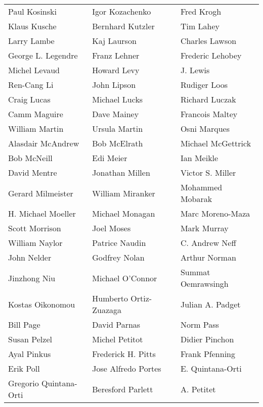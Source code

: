 \begin{tabular}{lll}
Paul Kosinski          & Igor Kozachenko        & Fred Krogh\\
Klaus Kusche           & Bernhard Kutzler       & Tim Lahey\\
Larry Lambe            & Kaj Laurson            & Charles Lawson\\
George L. Legendre     & Franz Lehner           & Frederic Lehobey\\
Michel Levaud          & Howard Levy            & J. Lewis\\
Ren-Cang Li            & John Lipson            & Rudiger Loos\\
Craig Lucas            & Michael Lucks          & Richard Luczak\\
Camm Maguire           & Dave Mainey            & Francois Maltey\\
William Martin         & Ursula Martin          & Osni Marques\\
Alasdair McAndrew      & Bob McElrath           & Michael McGettrick\\
Bob McNeill            & Edi Meier              & Ian Meikle\\
David Mentre           & Jonathan Millen        & Victor S. Miller\\
Gerard Milmeister      & William Miranker       & Mohammed Mobarak\\
H. Michael Moeller     & Michael Monagan        & Marc Moreno-Maza\\
Scott Morrison         & Joel Moses             & Mark Murray\\
William Naylor         & Patrice Naudin         & C. Andrew Neff\\
John Nelder            & Godfrey Nolan          & Arthur Norman\\
Jinzhong Niu           & Michael O'Connor       & Summat Oemrawsingh\\
Kostas Oikonomou       & Humberto Ortiz-Zuazaga & Julian A. Padget\\
Bill Page              & David Parnas           & Norm Pass\\
Susan Pelzel           & Michel Petitot         & Didier Pinchon\\
Ayal Pinkus            & Frederick H. Pitts     & Frank Pfenning\\
Erik Poll              & Jose Alfredo Portes    & E. Quintana-Orti\\
Gregorio Quintana-Orti & Beresford Parlett      & A. Petitet\\

\end{tabular}
